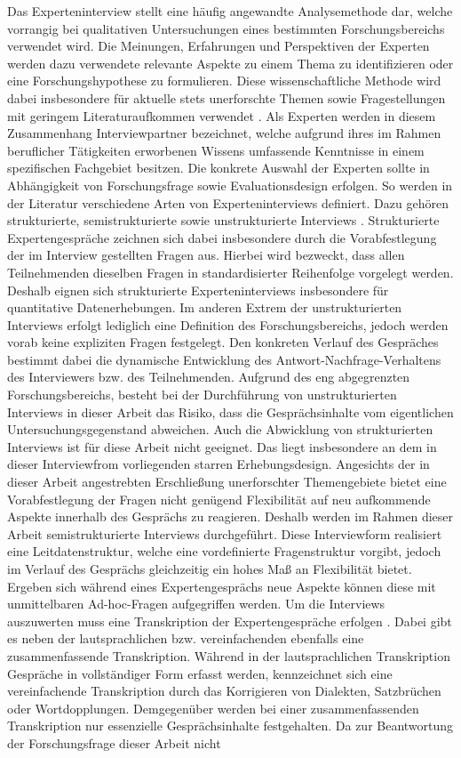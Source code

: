 Das Experteninterview stellt eine häufig angewandte Analysemethode dar, welche vorrangig bei qualitativen Untersuchungen eines bestimmten Forschungsbereichs verwendet wird. Die Meinungen, Erfahrungen und Perspektiven der Experten werden dazu verwendete relevante Aspekte zu einem Thema zu identifizieren oder eine Forschungshypothese zu formulieren. Diese wissenschaftliche Methode wird dabei insbesondere für aktuelle stets unerforschte Themen sowie Fragestellungen mit geringem Literaturaufkommen verwendet \cite[363 ff.]{Gerson.2021}. Als Experten werden in diesem Zusammenhang Interviewpartner bezeichnet, welche aufgrund ihres im Rahmen beruflicher Tätigkeiten erworbenen Wissens umfassende Kenntnisse in einem spezifischen Fachgebiet besitzen. Die konkrete Auswahl der Experten sollte in Abhängigkeit von Forschungsfrage sowie Evaluationsdesign erfolgen. So werden in der Literatur verschiedene Arten von Experteninterviews definiert. Dazu gehören strukturierte, semistrukturierte sowie unstrukturierte Interviews \cite[363 ff.]{Gerson.2021}. Strukturierte Expertengespräche zeichnen sich dabei insbesondere durch die Vorabfestlegung der im Interview gestellten Fragen aus. Hierbei wird bezweckt, dass allen Teilnehmenden dieselben Fragen in standardisierter Reihenfolge vorgelegt werden. Deshalb eignen sich strukturierte Experteninterviews insbesondere für quantitative Datenerhebungen. Im anderen Extrem der unstrukturierten Interviews erfolgt lediglich eine Definition des Forschungsbereichs, jedoch werden vorab keine expliziten Fragen festgelegt. Den konkreten Verlauf des Gespräches bestimmt dabei die dynamische Entwicklung des Antwort-Nachfrage-Verhaltens des Interviewers bzw. des Teilnehmenden. Aufgrund des eng abgegrenzten Forschungsbereichs, besteht bei der Durchführung von unstrukturierten Interviews in dieser Arbeit das Risiko, dass die Gesprächsinhalte vom eigentlichen Untersuchungsgegenstand abweichen. Auch die Abwicklung von strukturierten Interviews ist für diese Arbeit nicht geeignet. Das liegt insbesondere an dem in dieser Interviewfrom vorliegenden starren Erhebungsdesign. Angesichts der in dieser Arbeit angestrebten Erschließung unerforschter Themengebiete bietet eine Vorabfestlegung der Fragen nicht genügend Flexibilität auf neu aufkommende Aspekte innerhalb des Gesprächs zu reagieren. Deshalb werden im Rahmen dieser Arbeit semistrukturierte Interviews durchgeführt. Diese Interviewform realisiert eine Leitdatenstruktur, welche eine vordefinierte Fragenstruktur vorgibt, jedoch im Verlauf des Gesprächs gleichzeitig ein hohes Maß an Flexibilität bietet. Ergeben sich während eines Expertengesprächs neue Aspekte können diese mit unmittelbaren Ad-hoc-Fragen aufgegriffen werden. Um die Interviews auszuwerten muss eine Transkription der Expertengespräche erfolgen \cite[244 ff.]{Hildebrandt.2015}. Dabei gibt es neben der lautsprachlichen bzw. vereinfachenden ebenfalls eine zusammenfassende Transkription. Während in der lautsprachlichen Transkription Gespräche in vollständiger Form erfasst werden, kennzeichnet sich eine vereinfachende Transkription durch das Korrigieren von Dialekten, Satzbrüchen oder Wortdopplungen. Demgegenüber werden bei einer zusammenfassenden Transkription  nur essenzielle Gesprächsinhalte festgehalten. Da zur Beantwortung der Forschungsfrage dieser Arbeit nicht 